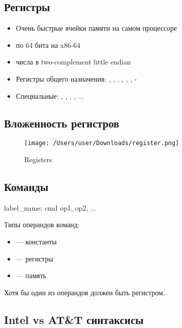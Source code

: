   \subsection{Регистры}
    \begin{itemize}
      \item Очень быстрые ячейки памяти на самом процессоре
      \item по 64 бита на x86-64
      \item числа в two-complement little endian
      \item Регистры общего назначения: , , , , , , -
      \item Специальные: , , , , ...
    \end{itemize}
  
  \subsection{Вложенность регистров}
\begin{figure}[H]
  \centering
  \texttt{[image: /Users/user/Downloads/register.png]}
  \caption{Registers}
  \label{fig:registers}
\end{figure}

  \subsection{Команды}
    \begin{asmminted}
label_name:
  cmd op1, op2, ...  
    \end{asmminted}
    
    Типы операндов команд:
    \begin{itemize}
      \item {} — константы
      \item {} — регистры
      \item {} — память
    \end{itemize}
    Хотя бы один из операндов должен быть регистром.
  
  \subsection{Intel vs AT\&T синтаксисы}
  

